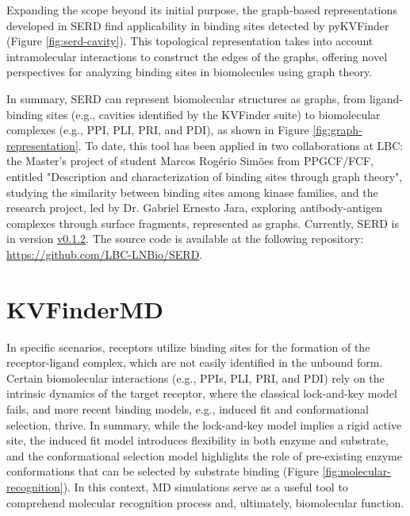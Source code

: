 \documentclass[Ingles]{phdthesis}
\def\eg{e.g.\onedot}
\begin{document}
Expanding the scope beyond its initial purpose, the graph-based representations developed in SERD find applicability in binding sites detected by pyKVFinder (Figure \ref{fig:serd-cavity}). This topological representation takes into account intramolecular interactions to construct the edges of the graphs, offering novel perspectives for analyzing binding sites in biomolecules using graph theory.


In summary, SERD can represent biomolecular structures as graphs, from ligand-binding sites (\eg, cavities identified by the KVFinder suite) to biomolecular complexes (\eg, \acs{PPI}, \acs{PLI}, \acs{PRI}, and \acs{PDI}), as shown in Figure \ref{fig:graph-representation}. To date, this tool has been applied in two collaborations at \acs{LBC}: the Master's project of student Marcos Rogério Simões from \acs{PPGCF}/\acs{FCF}, entitled "Description and characterization of binding sites through graph theory", studying the similarity between binding sites among kinase families, and the research project, led by Dr. Gabriel Ernesto Jara, exploring antibody-antigen complexes through surface fragments, represented as graphs. Currently, \acs{SERD} is in version \href{https://github.com/LBC-LNBio/SERD/releases/tag/v0.1.2}{v0.1.2}. The source code is available at the following repository: \url{https://github.com/LBC-LNBio/SERD}.

\section{KVFinderMD}

In specific scenarios, receptors utilize binding sites for the formation of the receptor-ligand complex, which are not easily identified in the unbound form. Certain biomolecular interactions (\eg, \acsp{PPI}, \acs{PLI}, \acs{PRI}, and \acs{PDI}) rely on the intrinsic dynamics of the target receptor, where the classical lock-and-key model fails, and more recent binding models, \eg, induced fit and conformational selection, thrive. In summary, while the lock-and-key model implies a rigid active site, the induced fit model introduces flexibility in both enzyme and substrate, and the conformational selection model highlights the role of pre-existing enzyme conformations that can be selected by substrate binding \cite{holyoak2013} (Figure \ref{fig:molecular-recognition}). In this context, \acs{MD} simulations serve as a useful tool to comprehend molecular recognition process and, ultimately, biomolecular function.
\end{document}
